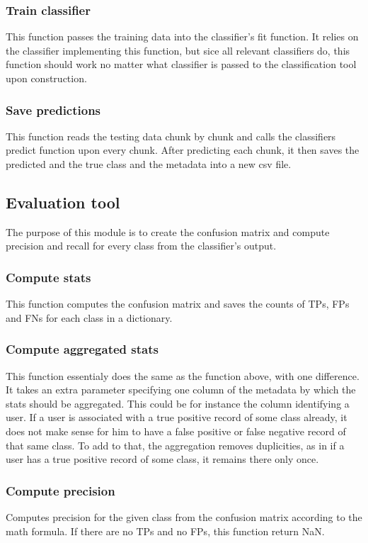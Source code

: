 \documentclass{article}
\begin{document}
      \subsubsection{Train classifier}
        This function passes the training data into the classifier's fit function. It relies on the classifier implementing this function, but sice all relevant classifiers do, this function should work no matter what classifier is passed to the classification tool upon construction.
      \subsubsection{Save predictions}
        This function reads the testing data chunk by chunk and calls the classifiers predict function upon every chunk. After predicting each chunk, it then saves the predicted and the true class and the metadata into a new csv file.
    \newpage
    \subsection{Evaluation tool}
      The purpose of this module is to create the confusion matrix and compute precision and recall for every class from the classifier's output.
      \subsubsection{Compute stats}
        This function computes the confusion matrix and saves the counts of TPs, FPs and FNs for each class in a dictionary.
      \subsubsection{Compute aggregated stats}
        This function essentialy does the same as the function above, with one difference. It takes an extra parameter specifying one column of the metadata by which the stats should be aggregated. This could be for instance the column identifying a user. If a user is associated with a true positive record of some class already, it does not make sense for him to have a false positive or false negative record of that same class. To add to that, the aggregation removes duplicities, as in if a user has a true positive record of some class, it remains there only once.
      \subsubsection{Compute precision}
        Computes precision for the given class from the confusion matrix according to the math formula. If there are no TPs and no FPs, this function return NaN.
\end{document}
